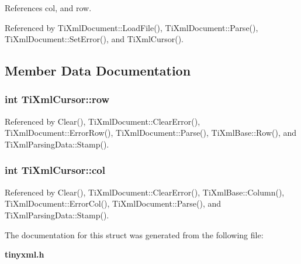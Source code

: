 References col, and row.

Referenced by TiXmlDocument::LoadFile(), TiXmlDocument::Parse(), TiXmlDocument::SetError(), and TiXmlCursor().

\subsection{Member Data Documentation}
\subsubsection[row]{\setlength{\rightskip}{0pt plus 5cm}int {\bf TiXmlCursor::row}}\label{structTiXmlCursor_5b54dd949820c2db061e2be41f3effb3}




Referenced by Clear(), TiXmlDocument::ClearError(), TiXmlDocument::ErrorRow(), TiXmlDocument::Parse(), TiXmlBase::Row(), and TiXmlParsingData::Stamp().
\subsubsection[col]{\setlength{\rightskip}{0pt plus 5cm}int {\bf TiXmlCursor::col}}\label{structTiXmlCursor_5694d7ed2c4d20109d350c14c417969d}




Referenced by Clear(), TiXmlDocument::ClearError(), TiXmlBase::Column(), TiXmlDocument::ErrorCol(), TiXmlDocument::Parse(), and TiXmlParsingData::Stamp().

The documentation for this struct was generated from the following file:\begin{CompactItemize}
\item 
{\bf tinyxml.h}\end{CompactItemize}
